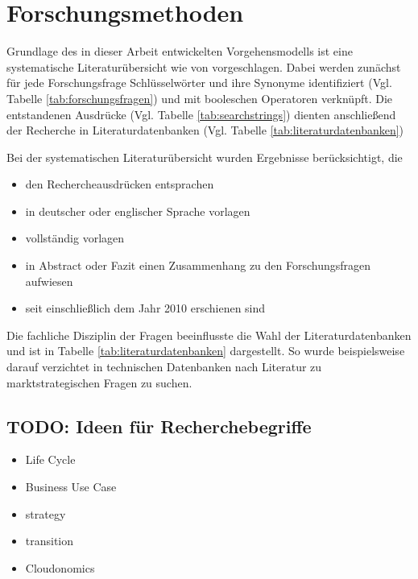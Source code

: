 \section{Forschungsmethoden}
\label{cha:method}
Grundlage des in dieser Arbeit entwickelten Vorgehensmodells ist eine
systematische Literaturübersicht wie von 
vorgeschlagen. Dabei werden zunächst für jede Forschungsfrage Schlüsselwörter
und ihre Synonyme identifiziert (Vgl. Tabelle
\ref{tab:forschungsfragen}) und mit booleschen Operatoren
verknüpft. Die entstandenen Ausdrücke (Vgl. Tabelle
\ref{tab:searchstrings}) dienten anschließend der Recherche in
Literaturdatenbanken (Vgl. Tabelle \ref{tab:literaturdatenbanken})


Bei der systematischen Literaturübersicht wurden Ergebnisse berücksichtigt, die
\begin{itemize}
	\item den Rechercheausdrücken entsprachen
	\item in deutscher oder englischer Sprache vorlagen
	\item vollständig vorlagen
	\item in Abstract oder Fazit einen Zusammenhang zu den Forschungsfragen
aufwiesen
	\item seit einschließlich dem Jahr 2010 erschienen sind
\end{itemize}

Die fachliche Disziplin der Fragen beeinflusste die Wahl der
Literaturdatenbanken und ist in Tabelle \ref{tab:literaturdatenbanken}
dargestellt. So wurde beispielsweise darauf verzichtet in technischen
Datenbanken nach Literatur zu marktstrategischen Fragen zu suchen.



\subsection{TODO: Ideen für Recherchebegriffe}
\begin{itemize}
	\item Life Cycle
	\item Business Use Case
	\item strategy
	\item transition
	\item Cloudonomics
\end{itemize}


\begin{comment}
In diesem Kapitel erläutern Sie ihre Forschungsmethode unter Verwendung von
entsprechenden Quellen.
Begründen Sie auch, warum Sie sich für diese Forschungsmethode entschieden
haben
und warum sie geeignet ist, die vorliegende Forschungsfrage zu beantworten.
\end{comment}
